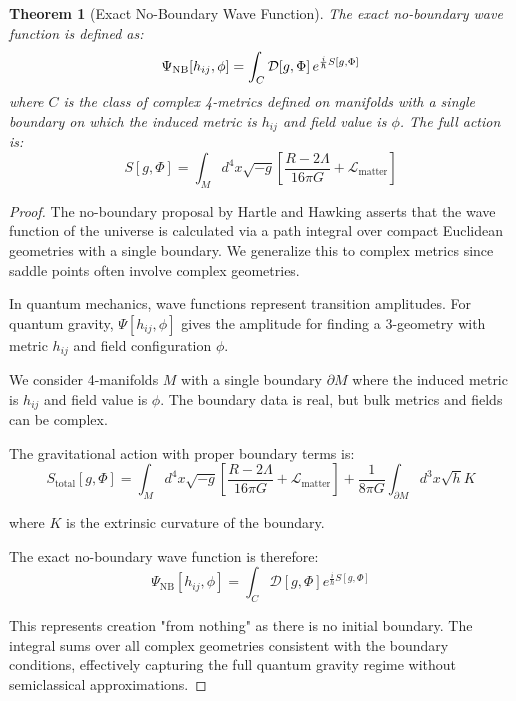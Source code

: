 \documentclass{article}
\newtheorem{theorem}{Theorem}
\begin{document}
\begin{theorem}[Exact No-Boundary Wave Function]
  The exact no-boundary wave function is defined as:
  \begin{equation}
    \Psi_{\text{NB}} [h_{ij}, \phi] = \int_C \mathcal{D} [g, \Phi] 
    \hspace{0.17em} e^{\frac{i}{\hbar} S [g, \Phi]}
  \end{equation}
  where $C$ is the class of complex 4-metrics defined on manifolds with a
  single boundary on which the induced metric is $h_{ij}$ and field value is
  $\phi$. The full action is:
  \begin{equation}
    S [g, \Phi] = \int_M d^4 x \sqrt{- g}  \left[ \frac{R - 2 \Lambda}{16 \pi
    G} +\mathcal{L}_{\text{matter}} \right]
  \end{equation}
\end{theorem}

\begin{proof}
The no-boundary proposal by Hartle and Hawking asserts that the wave function of the universe is calculated via a path integral over compact Euclidean geometries with a single boundary. We generalize this to complex metrics since saddle points often involve complex geometries.

In quantum mechanics, wave functions represent transition amplitudes. For quantum gravity, $\Psi[h_{ij}, \phi]$ gives the amplitude for finding a 3-geometry with metric $h_{ij}$ and field configuration $\phi$.

We consider 4-manifolds $M$ with a single boundary $\partial M$ where the induced metric is $h_{ij}$ and field value is $\phi$. The boundary data is real, but bulk metrics and fields can be complex.

The gravitational action with proper boundary terms is:
\begin{equation}
S_\text{total}[g, \Phi] = \int_M d^4x \sqrt{-g} \left[\frac{R - 2\Lambda}{16\pi G} + \mathcal{L}_\text{matter}\right] + \frac{1}{8\pi G}\int_{\partial M} d^3x \sqrt{h} K
\end{equation}

where $K$ is the extrinsic curvature of the boundary.

The exact no-boundary wave function is therefore:
\begin{equation}
\Psi_\text{NB}[h_{ij}, \phi] = \int_C \mathcal{D}[g, \Phi] e^{\frac{i}{\hbar}S[g, \Phi]}
\end{equation}

This represents creation "from nothing" as there is no initial boundary. The integral sums over all complex geometries consistent with the boundary conditions, effectively capturing the full quantum gravity regime without semiclassical approximations.
\end{proof}
\end{document}
